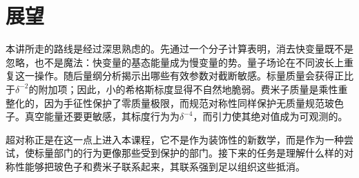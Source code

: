\section{展望}

本讲所走的路线是经过深思熟虑的。先通过一个分子计算表明，消去快变量既不是忽略，也不是魔法：快变量的基态能量成为慢变量的势。量子场论在不同波长上重复这一操作。随后量纲分析揭示出哪些有效参数对截断敏感。标量质量会获得正比于\(\delta^{-2}\)的附加项；因此，小的希格斯标度显得不自然地脆弱。费米子质量是乘性重整化的，因为手征性保护了零质量极限，而规范对称性同样保护无质量规范玻色子。真空能量还要更敏感，其标度行为为\(\delta^{-4}\)，而引力使其绝对值成为可观测的。

超对称正是在这一点上进入本课程，它不是作为装饰性的新数学，而是作为一种尝试，使标量部门的行为更像那些受到保护的部门。接下来的任务是理解什么样的对称性能够把玻色子和费米子联系起来，其联系强到足以组织这些抵消。